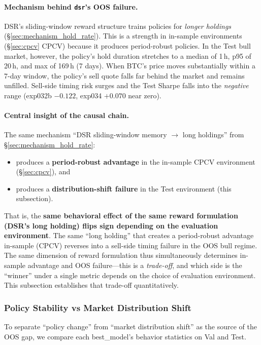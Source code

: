 \documentclass[11pt, a4paper]{article}
\begin{document}
\paragraph{Mechanism behind \texttt{dsr}'s OOS failure.}
DSR's sliding-window reward structure trains policies for \emph{longer
holdings} (\S\ref{sec:mechanism_hold_rate}). This is a strength in in-sample
environments (\S\ref{sec:cpcv} CPCV) because it produces period-robust
policies. In the Test bull market, however, the policy's hold duration
stretches to a median of 1\,h, p95 of 20\,h, and max of 169\,h (7 days). When BTC's price
moves substantially within a 7-day window, the policy's sell quote falls
far behind the market and remains unfilled. Sell-side timing risk surges and
the Test Sharpe falls into the \emph{negative} range (exp032b $-0.122$,
exp034 $+0.070$ near zero).

\paragraph{Central insight of the causal chain.}
The same mechanism ``DSR sliding-window memory $\to$ long holdings'' from
\S\ref{sec:mechanism_hold_rate}:
\begin{itemize}[leftmargin=*]
\item produces a \textbf{period-robust advantage} in the in-sample CPCV
environment (\S\ref{sec:cpcv}), and
\item produces a \textbf{distribution-shift failure} in the Test environment
(this subsection).
\end{itemize}
That is, the \textbf{same behavioral effect of the same reward formulation
(DSR's long holding) flips sign depending on the evaluation environment}.
The same ``long holding'' that creates a period-robust advantage in-sample
(CPCV) reverses into a sell-side timing failure in the OOS bull regime.
The same dimension of reward formulation thus simultaneously determines
in-sample advantage and OOS failure---this is a \emph{trade-off}, and which
side is the ``winner'' under a single metric depends on the choice of
evaluation environment. This subsection establishes that trade-off
quantitatively.

\subsubsection{Policy Stability vs Market Distribution Shift}
\label{sec:oos_policy_stability}

To separate ``policy change'' from ``market distribution shift'' as the
source of the OOS gap, we compare each best\_model's behavior statistics on
Val and Test.
\end{document}
